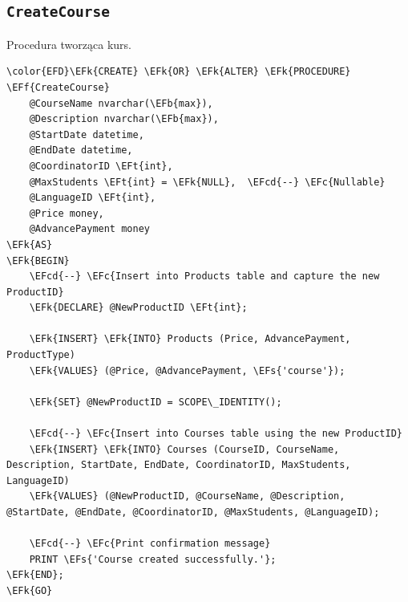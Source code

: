 \documentclass[11pt]{article}
\newcommand{\EFc}[1]{\textcolor{EFc}{\textit{#1}}} %
\newcommand{\EFcd}[1]{\textcolor{EFcd}{\textit{#1}}} %
\newcommand{\EFs}[1]{\textcolor{EFs}{#1}} %
\newcommand{\EFk}[1]{\textcolor{EFk}{\textbf{#1}}} %
\newcommand{\EFb}[1]{\textcolor{EFb}{\textbf{#1}}} %
\newcommand{\EFf}[1]{\textcolor{EFf}{#1}} %
\newcommand{\EFt}[1]{\textcolor{EFt}{\textbf{#1}}} %
\begin{document}
\subsection{\texttt{CreateCourse}}
\label{sec:orga63f5e5}
Procedura tworząca kurs.
\begin{Code}
\begin{Verbatim}
\color{EFD}\EFk{CREATE} \EFk{OR} \EFk{ALTER} \EFk{PROCEDURE} \EFf{CreateCourse}
    @CourseName nvarchar(\EFb{max}),
    @Description nvarchar(\EFb{max}),
    @StartDate datetime,
    @EndDate datetime,
    @CoordinatorID \EFt{int},
    @MaxStudents \EFt{int} = \EFk{NULL},  \EFcd{--} \EFc{Nullable}
    @LanguageID \EFt{int},
    @Price money,
    @AdvancePayment money
\EFk{AS}
\EFk{BEGIN}
    \EFcd{--} \EFc{Insert into Products table and capture the new ProductID}
    \EFk{DECLARE} @NewProductID \EFt{int};

    \EFk{INSERT} \EFk{INTO} Products (Price, AdvancePayment, ProductType)
    \EFk{VALUES} (@Price, @AdvancePayment, \EFs{'course'});

    \EFk{SET} @NewProductID = SCOPE\_IDENTITY();

    \EFcd{--} \EFc{Insert into Courses table using the new ProductID}
    \EFk{INSERT} \EFk{INTO} Courses (CourseID, CourseName, Description, StartDate, EndDate, CoordinatorID, MaxStudents, LanguageID)
    \EFk{VALUES} (@NewProductID, @CourseName, @Description, @StartDate, @EndDate, @CoordinatorID, @MaxStudents, @LanguageID);

    \EFcd{--} \EFc{Print confirmation message}
    PRINT \EFs{'Course created successfully.'};
\EFk{END};
\EFk{GO}
\end{Verbatim}
\end{Code}
\end{document}
